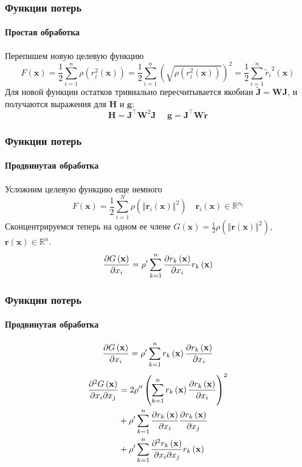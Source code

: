 \documentclass[notheorems,aspectratio=169]{beamer}
\begin{document}
\begin{frame}
  \frametitle{Функции потерь}
  \framesubtitle{Простая обработка}
  Перепишем новую целевую функцию
  $$F\left(\mathbf{x}\right)=\frac{1}{2}\sum_{i=1}^n\rho\left(r_i^2\left(\mathbf{x}\right)\right)=\frac{1}{2}\sum_{i=1}^n\left(\sqrt{\rho\left(r_i^2\left(\mathbf{x}\right)\right)}\right)^2=\frac{1}{2}\sum_{i=1}^n{\tilde{r}_i}^2\left(\mathbf{x}\right)$$
  Для новой функции остатков тривиально пересчитывается якобиан $\tilde{\mathbf{J}}=\mathbf{W}\mathbf{J}$, и получаются выражения для $\mathbf{H}$ и $\mathbf{g}$:
  $$\mathbf{H}=\mathbf{J}^\intercal \mathbf{W}^2\mathbf{J} \,\,\,\,\,\,\,\, \mathbf{g}=\mathbf{J}^\intercal\mathbf{W}\tilde{\mathbf{r}}$$
\end{frame}

\begin{frame}
  \frametitle{Функции потерь}
  \framesubtitle{Продвинутая обработка}
  Усложним целевую функцию еще немного
    $$F\left(\mathbf{x}\right)=\frac{1}{2}\sum_{i=1}^N\rho\left(\left\Vert\mathbf{r}_i\left(\mathbf{x}\right)\right\Vert^2\right)\,\,\,\,\,\,\mathbf{r}_i\left(\mathbf{x}\right)\in\mathbb{R}^{n_i}$$
  Сконцентрируемся теперь на одном ее члене $G\left(\mathbf{x}\right)=\frac{1}{2}\rho\left(\left\Vert\mathbf{r}\left(\mathbf{x}\right)\right\Vert^2\right)$, $\mathbf{r}\left(\mathbf{x}\right)\in \mathbb{R}^n$.
    \begin{equation*}
      \begin{gathered}
        \pdv{G\left(\mathbf{x}\right)}{x_i}=\rho'\sum_{k=1}^n\pdv{r_k\left(\mathbf{x}\right)}{x_i}r_k\left(\mathbf{x}\right)
      \end{gathered}
    \end{equation*}
\end{frame}

\begin{frame}
  \frametitle{Функции потерь}
  \framesubtitle{Продвинутая обработка}

  \begin{equation*}
      \pdv{G\left(\mathbf{x}\right)}{x_i}=\rho'\sum_{k=1}^nr_k\left(\mathbf{x}\right)\pdv{r_k\left(\mathbf{x}\right)}{x_i}
  \end{equation*}
      {\begin{align}
        \pdv{G\left(\mathbf{x}\right)}{x_i}{x_j}
         & =2\rho''\left(\sum_{k=1}^nr_k\left(\mathbf{x}\right)\pdv{r_k\left(\mathbf{x}\right)}{x_i}\right)^2 \label{dd:1} \\
         & +\rho'\sum_{k=1}^n\pdv{r_k\left(\mathbf{x}\right)}{x_i}\pdv{r_k\left(\mathbf{x}\right)}{x_j} \label{dd:2} \\
         & +\rho'\sum_{k=1}^n\pdv{r_k\left(\mathbf{x}\right)}{x_i}{x_j}r_k\left(\mathbf{x}\right) \label{dd:3}
      \end{align}}
\end{frame}
\end{document}

